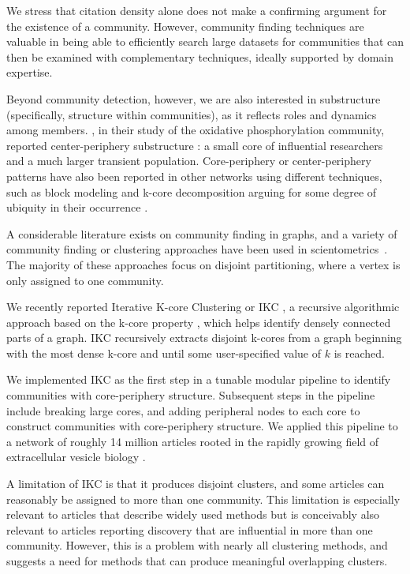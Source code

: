 \documentclass[12pt, oneside]{article}   	%
\begin{document}
We stress that citation density alone does not make a confirming argument for the existence of a community. However, community finding techniques are valuable in being able to efficiently search large datasets for communities that can then be examined with complementary techniques, ideally supported by domain expertise.

Beyond community detection, however, we are also interested in substructure (specifically, structure within communities), as it reflects roles and dynamics among members. \cite{Price1966}, in their study of the oxidative phosphorylation community, reported center-periphery substructure \citep{Breiger2014}: a small core of influential researchers and a much larger transient population. Core-periphery or center-periphery patterns have also been reported in other networks using different techniques, such as block modeling and k-core decomposition arguing for some degree of ubiquity in their occurrence \citep{borgatti2000models,Rombach2017,gallagher2021clarified,yanchenko_2202.04455}. 

A considerable literature exists on community finding in graphs, and a variety of community finding or clustering approaches have been used in scientometrics~\citep{Newman2006,Fortunato2009,Boyack2010,Boyack2019,Traag2019,Ahlgren2020,Chandrasekharan2021,Wedell2022}. The majority of these approaches focus on disjoint partitioning, where a vertex is only assigned to one community. 

We recently reported Iterative K-core Clustering or IKC \citep{Wedell2022}, a recursive algorithmic approach based on the k-core property \citep{Giatsidis2011,malliaros2019}, which helps identify densely connected parts of a graph. IKC recursively extracts disjoint k-cores from a graph beginning with the most dense  k-core and until some user-specified value of $k$ is reached. 

We implemented IKC as the first step in a tunable modular pipeline to identify communities with core-periphery structure. Subsequent steps in the pipeline include breaking large cores, and adding peripheral nodes to each core to construct communities with core-periphery structure. We applied this pipeline to a network of roughly 14 million articles rooted in the rapidly growing field of extracellular vesicle biology \citep{Wedell2022}. 

A limitation of IKC is that  it produces disjoint clusters, and some articles can reasonably be assigned to more than one community. This limitation is especially relevant to articles that describe widely used methods but is conceivably also relevant to articles reporting discovery that are influential in more than one community.   However, this is a problem with nearly all clustering methods, and suggests a need for methods that can produce meaningful overlapping clusters. 
\end{document}
